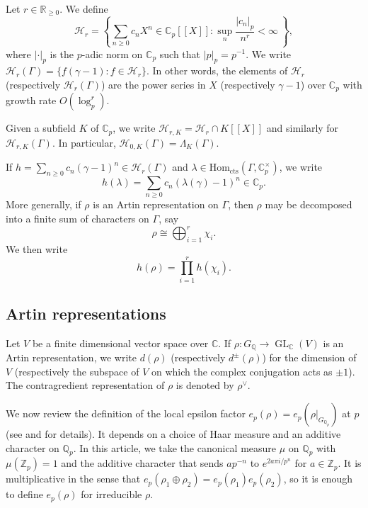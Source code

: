 \documentclass{amsart}
\begin{document}
Let $r\in{\mathbb R}_{\ge0}$. We define
\[
{\mathcal{H}}_r=\left\{\sum_{n\geq0}c_{n} X^n\in{\mathbb C}_p[[X]]:\sup_{n}\frac{|c_{n}|_p}{n^r}<\infty\ \right\},
\]
where $|\cdot|_p$ is the $p$-adic norm on ${\mathbb C}_p$ such that $|p|_p=p^{-1}$. We write ${\mathcal{H}}_r(\Gamma)=\{f(\gamma-1):f\in{\mathcal{H}}_r\}$. In other words, the elements of ${\mathcal{H}}_r$ (respectively ${\mathcal{H}}_r(\Gamma)$) are the power series in $X$ (respectively $\gamma-1$) over ${\mathbb C}_p$ with growth rate $O(\log_p^r)$. 

Given a subfield $K$ of ${\mathbb C}_p$, we write ${\mathcal{H}}_{r,K}={\mathcal{H}}_r\cap K[[X]]$ and similarly for ${\mathcal{H}}_{r,K}(\Gamma)$. In particular, ${\mathcal{H}}_{0,K}(\Gamma)=\Lambda_{K}(\Gamma)$. 

If $h=\sum_{n\ge 0} c_{n}(\gamma-1)^n\in{\mathcal{H}}_r(\Gamma)$ and $\lambda\in{\mathrm{Hom_{cts}}}(\Gamma,{\mathbb C}_p^\times)$, we write
\[
h(\lambda)=\sum_{n\ge 0} c_{n}(\lambda(\gamma)-1)^n\in{\mathbb C}_p.
\]
More generally, if $\rho$ is an Artin representation on $\Gamma$, then $\rho$ may be decomposed into a finite sum of characters on $\Gamma$, say 
\[
\rho\cong\bigoplus_{i=1}^r\chi_i.
\]
 We then write
\[
h(\rho)=\prod_{i=1}^rh(\chi_i).
\]

\subsection{Artin representations}

Let $V$ be a finite dimensional vector space over ${\mathbb C}$. If $\rho:G_{\mathbb Q}\rightarrow \operatorname{GL}_{\mathbb C}(V)$ is an Artin representation, we write $d(\rho)$ (respectively $d^\pm(\rho)$) for the dimension of $V$ (respectively the subspace of $V$ on which the complex conjugation acts as $\pm1$). The contragredient representation of $\rho$ is denoted by $\rho^\vee$.

We now review the definition of the local epsilon factor $e_p(\rho)=e_p(\rho|_{G_{{\mathbb Q}_p}})$ at $p$ (see \cite[\S3]{tatebackground} and \cite[\S6.10]{dokchitsers07} for details). It depends on a choice of Haar measure and an additive character on ${{\mathbb Q}_p}$. In this article, we take the canonical measure $\mu$ on ${{\mathbb Q}_p}$ with $\mu({{\mathbb Z}_p})=1$ and the additive character that sends $ap^{-n}$ to $e^{2a\pi i/p^n}$ for $a\in{{\mathbb Z}_p}$. It is multiplicative in the sense that $e_p(\rho_1\oplus\rho_2)=e_p(\rho_1)e_p(\rho_2)$, so it is enough to define $e_p(\rho)$ for irreducible $\rho$.
\end{document}
